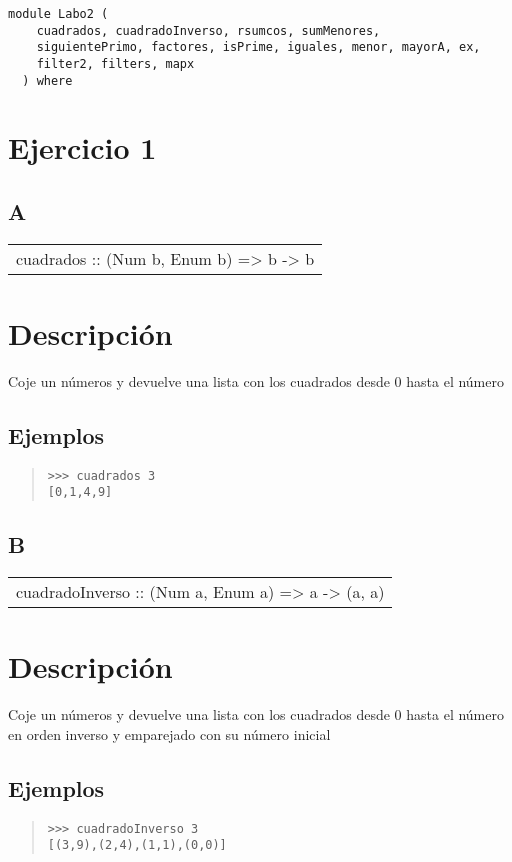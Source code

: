 \label{module:Labo2}
\haddockbeginheader
{\haddockverb\begin{verbatim}
module Labo2 (
    cuadrados, cuadradoInverso, rsumcos, sumMenores,
    siguientePrimo, factores, isPrime, iguales, menor, mayorA, ex,
    filter2, filters, mapx
  ) where\end{verbatim}}
\haddockendheader

\section{Ejercicio 1}
\subsection{A}
\begin{haddockdesc}
\item[\begin{tabular}{@{}l}
cuadrados :: (Num b, Enum b) => b -> {\char 91}b{\char 93}
\end{tabular}]
{\haddockbegindoc
\section*{Descripción}
Coje un números y devuelve una lista con los cuadrados desde 0 hasta el número\par
\subsection*{Ejemplos}
\begin{quote}
{\haddockverb\begin{verbatim}
>>> cuadrados 3
[0,1,4,9]

\end{verbatim}}
\end{quote}}
\end{haddockdesc}
\subsection{B}
\begin{haddockdesc}
\item[\begin{tabular}{@{}l}
cuadradoInverso :: (Num a, Enum a) => a -> {\char 91}(a, a){\char 93}
\end{tabular}]
{\haddockbegindoc
\section*{Descripción}
Coje un números y devuelve una lista con los cuadrados desde 0 hasta el número en orden inverso y emparejado con su número inicial\par
\subsection*{Ejemplos}
\begin{quote}
{\haddockverb\begin{verbatim}
>>> cuadradoInverso 3
[(3,9),(2,4),(1,1),(0,0)]

\end{verbatim}}
\end{quote}}
\end{haddockdesc}
